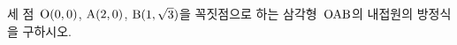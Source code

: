세 점~$\mathrm{O}(0{,}\mkern3mu\mathopen{}0)$, $\mathrm{A}(2{,}\mkern3mu\mathopen{}0)$, $\mathrm{B}(1{,}\mkern3mu\mathopen{}\sqrt{3})$을 꼭짓점으로 하는 삼각형~$\mathrm{OAB}$의 내접원의 방정식을 구하시오.
